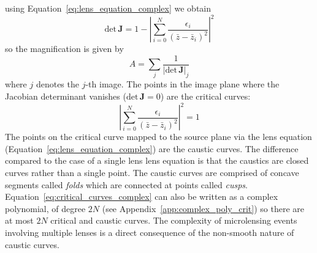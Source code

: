 \documentclass[12pt]{report}
\begin{document}
using Equation~\ref{eq:lens_equation_complex} we obtain
\begin{equation}
    \mathrm{det} \,\mathbf J=1-\left|\sum_{i=0}^{N} \frac{\epsilon_{i}}{\left(\bar{z}-\bar{z}_i\right)^{2}}\right|^{2}
\end{equation}
so the magnification is given by
\begin{equation}
    A = \sum_j \frac{1}{\left|\mathrm{det}\,\mathbf J\right|_j}
\end{equation}
where $j$ denotes the $j$-th image. The points in the image plane where the Jacobian determinant vanishes
($\mathrm{det}\,\mathbf J=0$) are the critical curves:
\begin{equation}
    \left|\sum_{i=0}^{N} \frac{\epsilon_{i}}{\left(\bar{z}-\bar{z}_i\right)^{2}}\right|^{2}=1
    \label{eq:critical_curves_complex}
\end{equation}
The points on the critical curve mapped to the source plane via
the lens equation (Equation~\ref{eq:lens_equation_complex}) are the caustic curves.
The difference compared to the case of a single lens lens equation is that the caustics are closed curves
rather than a single point. The caustic curves are comprised of concave segments called \emph{folds} which are connected
at points called \emph{cusps}.
Equation~\ref{eq:critical_curves_complex} can also be written as a complex polynomial, of
degree $2N$ (see Appendix~\ref{app:complex_poly_crit}) so there are at most $2N$ critical and caustic curves.
The complexity of microlensing events involving multiple lenses is a direct consequence of the
non-smooth nature of caustic curves.
\end{document}

